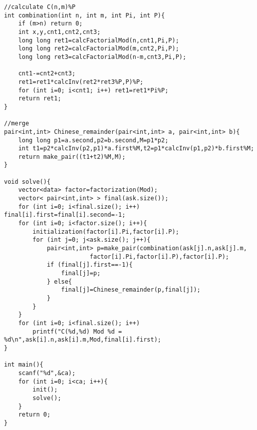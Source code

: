 \begin{verbatim}
//calculate C(n,m)%P
int combination(int n, int m, int Pi, int P){
    if (m>n) return 0;
    int x,y,cnt1,cnt2,cnt3;
    long long ret1=calcFactorialMod(n,cnt1,Pi,P);
    long long ret2=calcFactorialMod(m,cnt2,Pi,P);
    long long ret3=calcFactorialMod(n-m,cnt3,Pi,P);

    cnt1-=cnt2+cnt3;
    ret1=ret1*calcInv(ret2*ret3%P,P)%P;
    for (int i=0; i<cnt1; i++) ret1=ret1*Pi%P;
    return ret1;
}

//merge
pair<int,int> Chinese_remainder(pair<int,int> a, pair<int,int> b){
    long long p1=a.second,p2=b.second,M=p1*p2;
    int t1=p2*calcInv(p2,p1)*a.first%M,t2=p1*calcInv(p1,p2)*b.first%M;
    return make_pair((t1+t2)%M,M);
}

void solve(){
    vector<data> factor=factorization(Mod);
    vector< pair<int,int> > final(ask.size());
    for (int i=0; i<final.size(); i++) final[i].first=final[i].second=-1;
    for (int i=0; i<factor.size(); i++){
        initialization(factor[i].Pi,factor[i].P);
        for (int j=0; j<ask.size(); j++){
            pair<int,int> p=make_pair(combination(ask[j].n,ask[j].m,  
                        factor[i].Pi,factor[i].P),factor[i].P);
            if (final[j].first==-1){
                final[j]=p;
            } else{
                final[j]=Chinese_remainder(p,final[j]);
            }
        }
    }
    for (int i=0; i<final.size(); i++)
        printf("C(%d,%d) Mod %d = %d\n",ask[i].n,ask[i].m,Mod,final[i].first);
}

int main(){
    scanf("%d",&ca);
    for (int i=0; i<ca; i++){
        init();
        solve();
    }
    return 0;
}
\end{verbatim}

